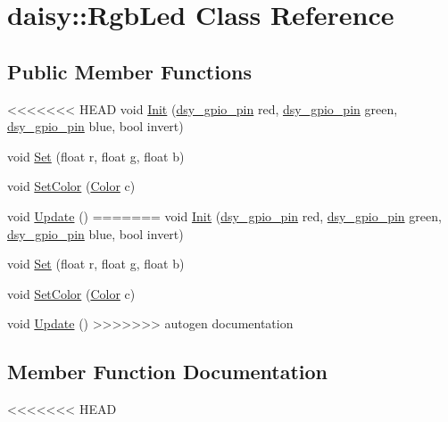 \hypertarget{classdaisy_1_1_rgb_led}{}\section{daisy\+:\+:Rgb\+Led Class Reference}
\label{classdaisy_1_1_rgb_led}
\subsection*{Public Member Functions}
\begin{DoxyCompactItemize}
\item 
<<<<<<< HEAD
void \hyperlink{classdaisy_1_1_rgb_led_aff3dc6ce4e2415a32ad09c41f003b7fe}{Init} (\hyperlink{structdsy__gpio__pin}{dsy\+\_\+gpio\+\_\+pin} red, \hyperlink{structdsy__gpio__pin}{dsy\+\_\+gpio\+\_\+pin} green, \hyperlink{structdsy__gpio__pin}{dsy\+\_\+gpio\+\_\+pin} blue, bool invert)
\item 
void \hyperlink{classdaisy_1_1_rgb_led_a342c072e678f5df25a8f638a91479d1f}{Set} (float r, float g, float b)
\item 
void \hyperlink{classdaisy_1_1_rgb_led_afc530391dc068788952edbe9907df8e9}{Set\+Color} (\hyperlink{classdaisy_1_1_color}{Color} c)
\item 
void \hyperlink{classdaisy_1_1_rgb_led_a6bf7b10c72831aa2d2a7f021822f1899}{Update} ()
=======
void \hyperlink{classdaisy_1_1_rgb_led_aea7e214ca5f39d1df9d307b6fce4463b}{Init} (\hyperlink{structdsy__gpio__pin}{dsy\+\_\+gpio\+\_\+pin} red, \hyperlink{structdsy__gpio__pin}{dsy\+\_\+gpio\+\_\+pin} green, \hyperlink{structdsy__gpio__pin}{dsy\+\_\+gpio\+\_\+pin} blue, bool invert)
\item 
void \hyperlink{classdaisy_1_1_rgb_led_a36369f2837770bd4e6b8240cfdc9ce18}{Set} (float r, float g, float b)
\item 
void \hyperlink{classdaisy_1_1_rgb_led_a54576a6b4bd3df768562ac677287bc53}{Set\+Color} (\hyperlink{classdaisy_1_1_color}{Color} c)
\item 
void \hyperlink{classdaisy_1_1_rgb_led_a9bb58197c1b1a71ffd26a86b26972f60}{Update} ()
>>>>>>> autogen documentation
\end{DoxyCompactItemize}


\subsection{Member Function Documentation}
<<<<<<< HEAD
\mbox{\label{classdaisy_1_1_rgb_led_aff3dc6ce4e2415a32ad09c41f003b7fe}} 
